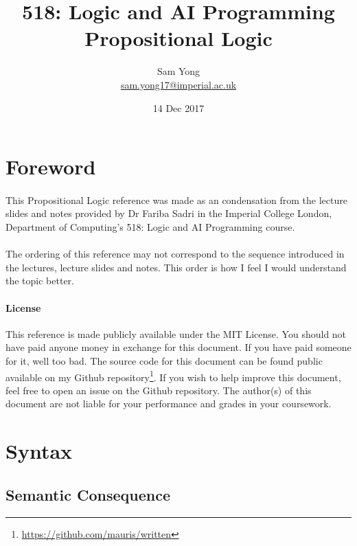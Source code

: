 \documentclass{article}
\title{
	 \large 518: Logic and AI Programming \\
	 \huge Propositional Logic
}
\date{14 Dec 2017}
\author{
	Sam Yong \\
	\small \href{mailto:sam.yong17@imperial.ac.uk}{sam.yong17@imperial.ac.uk}
}
\begin{document}
  \maketitle
  
  \begin{multicols}{2}
  
  \section*{Foreword}  
  
  \paragraph{} This Propositional Logic reference was made as an condensation from the lecture slides and notes provided by Dr Fariba Sadri in the Imperial College London, Department of Computing's 518: Logic and AI Programming course.
  
  \paragraph{} The ordering of this reference may not correspond to the sequence introduced in the lectures, lecture slides and notes. This order is how I feel I would understand the topic better.
  
  \begin{footnotesize}
  \paragraph{License} This reference is made publicly available under the MIT License. You should not have paid anyone money in exchange for this document. If you have paid someone for it, well too bad. The source code for this document can be found public available on my Github repository\footnote{\href{https://github.com/mauris/written}{https://github.com/mauris/written}}. If you wish to help improve this document, feel free to open an issue on the Github repository. The author(s) of this document are not liable for your performance and grades in your coursework. 
  \end{footnotesize}
  
  \section{Syntax}
  
  \subsection{Semantic Consequence}


\end{multicols}
\end{document}
